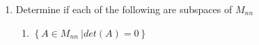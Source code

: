 \documentclass[12pt]{article}
\newcommand{\DS} [1] {${\displaystyle #1}$}
\begin{document}
\begin{enumerate}
\begin{proof}
                      Suppose $\vec{0_1}$ and $\vec{0}$ are zero vectors in $V$ Then
                      \begin{align*}
                              \vec{0_1} & = \vec{0_1} + \vec{0} & \textrm{(vector space axiom 4)} \\
                                        & = \vec{0} + \vec{0_1} & \textrm{(vector space axiom 2)} \\
                                        & = \vec{0}             & \textrm{(vector space axiom 4)}
                      \end{align*}
                      Therefore $\vec{0_1} = \vec{0}$. So, the zero vector is unique.
              \end{proof}
        \item Determine if each of the following are subspaces of $M_{nn}$
              \begin{enumerate}
                      \item \DS{ \left\{A\in{M_{nn}} \ | det (A) = 0 \right\}}

\end{enumerate}
\end{enumerate}
\end{document}
